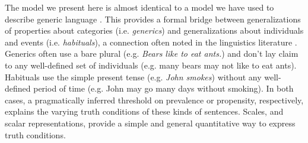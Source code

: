 \documentclass[10pt,letterpaper]{article}
\newcommand{\ndg}[1]{\textcolor{Green}{[ndg: #1]}}
\begin{document}

The model we present here is almost identical to a model we have used to describe generic language \cite{TesslerUnderReview}.
This provides a formal bridge between generalizations of properties about categories (i.e. \emph{generics}) and generalizations about individuals and events (i.e. \emph{habituals}), a connection often noted in the linguistics literature \cite{Carlson1977, Carlson2005, Cohen1999}. 
Generics often use a bare plural (e.g. \emph{Bears like to eat ants.}) and don't lay claim to any well-defined set of individuals (e.g. many bears may not like to eat ants).
Habituals use the simple present tense (e.g. \emph{John smokes}) without any well-defined period of time (e.g. John may go many days without smoking). 
In both cases, a pragmatically inferred threshold on prevalence or propensity, respectively, explains the varying truth conditions of these kinds of sentences.
Scales, and scalar representations, provide a simple and general quantitative way to express truth conditions.

\end{document}
